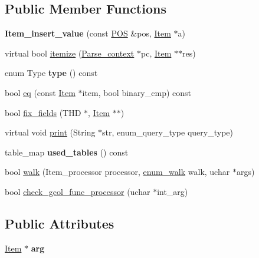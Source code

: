 \subsection*{Public Member Functions}
\begin{DoxyCompactItemize}
\item 
\mbox{\label{classItem__insert__value_a69bb21b81d898888eda0acb1f4e8dd2a}} 
{\bfseries Item\+\_\+insert\+\_\+value} (const \mbox{\hyperlink{structYYLTYPE}{P\+OS}} \&pos, \mbox{\hyperlink{classItem}{Item}} $\ast$a)
\item 
virtual bool \mbox{\hyperlink{classItem__insert__value_a113d00e28d63795bfd89d65dad61e769}{itemize}} (\mbox{\hyperlink{structParse__context}{Parse\+\_\+context}} $\ast$pc, \mbox{\hyperlink{classItem}{Item}} $\ast$$\ast$res)
\item 
\mbox{\label{classItem__insert__value_a6e0a67956a497b45e73662983edb02cf}} 
enum Type {\bfseries type} () const
\item 
bool \mbox{\hyperlink{classItem__insert__value_aa8be1a5d87cbe34ca0fc197a80522738}{eq}} (const \mbox{\hyperlink{classItem}{Item}} $\ast$item, bool binary\+\_\+cmp) const
\item 
bool \mbox{\hyperlink{classItem__insert__value_aa2da2c08853e6acded41a9e83f137ff8}{fix\+\_\+fields}} (T\+HD $\ast$, \mbox{\hyperlink{classItem}{Item}} $\ast$$\ast$)
\item 
virtual void \mbox{\hyperlink{classItem__insert__value_abbba2f565d5a63803b693a03f7184d14}{print}} (String $\ast$str, enum\+\_\+query\+\_\+type query\+\_\+type)
\item 
\mbox{\label{classItem__insert__value_a925048601422958a3f6801c16f3784cf}} 
table\+\_\+map {\bfseries used\+\_\+tables} () const
\item 
bool \mbox{\hyperlink{classItem__insert__value_a7023df48fccb11a014d348cbde3b35c6}{walk}} (Item\+\_\+processor processor, \mbox{\hyperlink{classItem_a4e68f315ba2a26543339e9f0efed3695}{enum\+\_\+walk}} walk, uchar $\ast$args)
\item 
bool \mbox{\hyperlink{classItem__insert__value_a6c64934ac5862b0e211f15e347a0a940}{check\+\_\+gcol\+\_\+func\+\_\+processor}} (uchar $\ast$int\+\_\+arg)
\end{DoxyCompactItemize}
\subsection*{Public Attributes}
\begin{DoxyCompactItemize}
\item 
\mbox{\label{classItem__insert__value_ab4c1e4de1f4b7b060968f58352449931}} 
\mbox{\hyperlink{classItem}{Item}} $\ast$ {\bfseries arg}
\end{DoxyCompactItemize}
